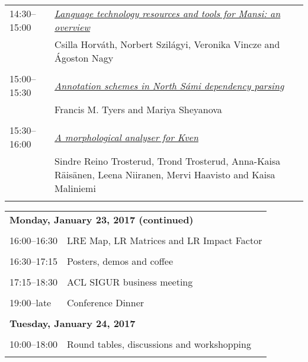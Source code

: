 \begin{tabular}{p{20mm}p{128mm}}
14:30--15:00 & \hyperlink{page.56}{\em Language technology resources and tools for Mansi: an overview}\\
         & Csilla Horv\'{a}th, Norbert Szil\'{a}gyi, Veronika Vincze and \'{A}goston Nagy \\
\\

15:00--15:30 & \hyperlink{page.66}{\em Annotation schemes in North S\'{a}mi dependency parsing}\\
         & Francis M. Tyers and Mariya Sheyanova \\
\\

15:30--16:00 & \hyperlink{page.76}{\em A morphological analyser for Kven}\\
         & Sindre Reino Trosterud, Trond Trosterud, Anna-Kaisa R\"{a}is\"{a}nen, Leena Niiranen, Mervi Haavisto and Kaisa Maliniemi \\
\\

\end{tabular}
\newpage
\begin{tabular}{p{20mm}p{138mm}}
\\
\multicolumn{2}{l}{\bf Monday, January 23, 2017 (continued)} \\\\
16:00--16:30 & LRE Map, LR Matrices and LR Impact Factor \\
\\
16:30--17:15 & Posters, demos and coffee \\
\\
17:15--18:30 & ACL SIGUR business meeting \\
\\
19:00--late & Conference Dinner \\
\\
\multicolumn{2}{l}{\bf Tuesday, January 24, 2017} \\
\\
10:00--18:00 & Round tables, discussions and workshopping \\
\\


\end{tabular}
